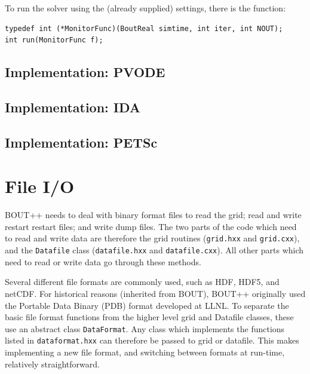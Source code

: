 \documentclass[12pt]{article}
\newcommand{\code}[1]{\texttt{#1}}
\begin{document}
To run the solver using the (already supplied) settings, there is
the function:
\begin{lstlisting}
typedef int (*MonitorFunc)(BoutReal simtime, int iter, int NOUT);
int run(MonitorFunc f);
\end{lstlisting}

\subsection{Implementation: PVODE}


\subsection{Implementation: IDA}

\subsection{Implementation: PETSc}

\section{File I/O}

BOUT++ needs to deal with binary format files to read the grid;
read and write restart restart files; and write dump files. 
The two parts of the code which need to read and write data are therefore
the grid routines (\code{grid.hxx} and \code{grid.cxx}), and the
\code{Datafile} class (\code{datafile.hxx} and \code{datafile.cxx}).
All other parts which need to read or write data go through these
methods.

Several different file formats are commonly used, such as HDF, HDF5, and netCDF. 
For historical reasons (inherited from BOUT), BOUT++ originally used the
Portable Data Binary (PDB) format developed at LLNL. 
To separate the basic file format functions from the higher level grid and 
Datafile classes, these use an abstract class \code{DataFormat}. Any
class which implements the functions listed in \code{dataformat.hxx}
can therefore be passed to grid or datafile. This makes implementing
a new file format, and switching between formats at run-time, 
relatively straightforward.
\end{document}
